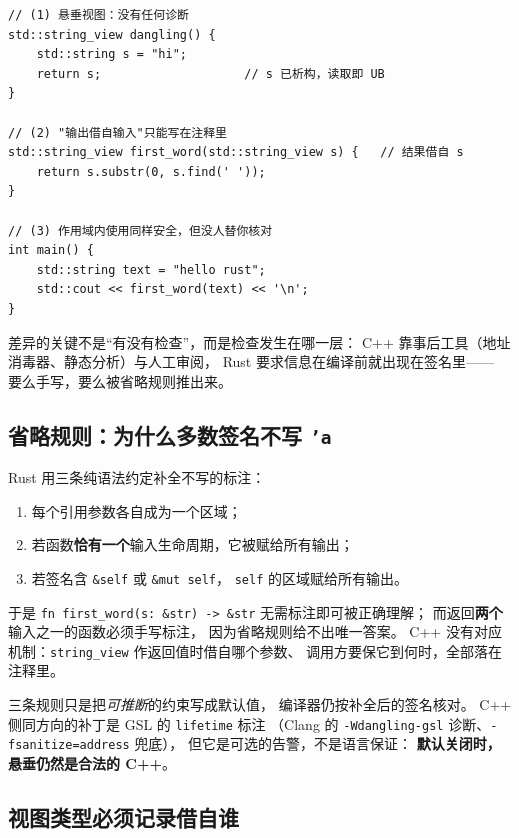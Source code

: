 \documentclass[12pt,a4paper,fontset=fandol]{ctexbook}
\begin{document}
\begin{lstlisting}[caption={同型代码在 C++ 里：(1)编译通过，运行期才出错}]
// (1) 悬垂视图：没有任何诊断
std::string_view dangling() {
    std::string s = "hi";
    return s;                    // s 已析构，读取即 UB
}

// (2) "输出借自输入"只能写在注释里
std::string_view first_word(std::string_view s) {   // 结果借自 s
    return s.substr(0, s.find(' '));
}

// (3) 作用域内使用同样安全，但没人替你核对
int main() {
    std::string text = "hello rust";
    std::cout << first_word(text) << '\n';
}
\end{lstlisting}

差异的关键不是``有没有检查''，而是检查发生在哪一层：
C++ 靠事后工具（地址消毒器、静态分析）与人工审阅，
Rust 要求信息在编译前就出现在签名里——
要么手写，要么被省略规则推出来。

\subsection{省略规则：为什么多数签名不写 \texttt{'a}}

Rust 用三条纯语法约定补全不写的标注：

\begin{enumerate}
  \item 每个引用参数各自成为一个区域；
  \item 若函数\textbf{恰有一个}输入生命周期，它被赋给所有输出；
  \item 若签名含 \texttt{\&self} 或 \texttt{\&mut self}，
        \texttt{self} 的区域赋给所有输出。
\end{enumerate}

于是 \texttt{fn first\_word(s: \&str) -> \&str} 无需标注即可被正确理解；
而返回\textbf{两个}输入之一的函数必须手写标注，
因为省略规则给不出唯一答案。
C++ 没有对应机制：\texttt{string\_view} 作返回值时借自哪个参数、
调用方要保它到何时，全部落在注释里。

\begin{warning}[title=省略不等于没有约束]
三条规则只是把\emph{可推断}的约束写成默认值，
编译器仍按补全后的签名核对。
C++ 侧同方向的补丁是 GSL 的 \texttt{lifetime} 标注
（Clang 的 \texttt{-Wdangling-gsl} 诊断、\texttt{-fsanitize=address} 兜底），
但它是可选的告警，不是语言保证：
\textbf{默认关闭时，悬垂仍然是合法的 C++}。
\end{warning}

\subsection{视图类型必须记录借自谁}
\end{document}
